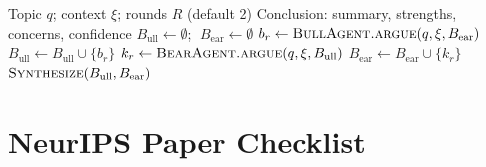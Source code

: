 \documentclass{article}
\theoremstyle{plain}
\theoremstyle{definition}
\begin{document}
\begin{algorithm}[ht!]
\caption{Multi-Round Adversarial Debate (\S\ref{sec:debate_algo})}
\label{alg:debate}
\begin{algorithmic}
\REQUIRE Topic $q$; context $\xi$; rounds $R$ (default 2)
\ENSURE Conclusion: summary, strengths, concerns, confidence
\STATE $B_\mathrm{ull} \leftarrow \emptyset$; $\;B_\mathrm{ear} \leftarrow \emptyset$
  \STATE $b_r \leftarrow \textsc{BullAgent.argue}(q, \xi, B_\mathrm{ear})$
  \STATE $B_\mathrm{ull} \leftarrow B_\mathrm{ull} \cup \{b_r\}$
  \STATE $k_r \leftarrow \textsc{BearAgent.argue}(q, \xi, B_\mathrm{ull})$
  \STATE $B_\mathrm{ear} \leftarrow B_\mathrm{ear} \cup \{k_r\}$
\ENDFOR
\RETURN $\textsc{Synthesize}(B_\mathrm{ull}, B_\mathrm{ear})$
\end{algorithmic}
\end{algorithm}

\newpage
\section*{NeurIPS Paper Checklist}
\end{document}
